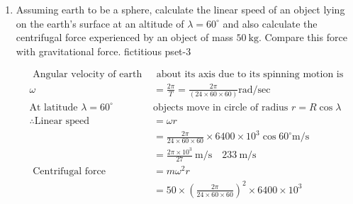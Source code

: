 \begin{enumerate} [label=\color{ocre}\textbf{\arabic*.}]
\begin{figure}[H]
	\centering
	\texttt{[image: pset-3- fict]}
\end{figure}
\begin{answer}
\begin{align*}
\text { Horizontal acceleration of the system is } a_{0}&=\frac{F}{M+m}
\intertext{According to question, the block does not slide on the wedge, therefore if block is seen from the reference frame of the wedge it will appear stationary. The wedge has a linear acceleration $a_{0}$ therefore if observation is made from the wedge frame a pseudo force $-m a_{0}$ must be applied on the block as shown in figure. Block is stationary on the wedge so component of forces parallel to the inclined plane must cancel.}
\text{Therefore,} \ m g \sin \theta&=m a_{0} \cos \theta\\  \text{or}\ \tan \theta&=\frac{a_{0}}{g}\\&=\frac{F}{(M+m) g}\\ \text{or}\ F&=(M+m) g \tan \theta
\end{align*}
\end{answer}
\item Assuming earth to be a sphere, calculate the linear speed of an object lying on the earth's surface at an altitude of $\lambda=60^{\circ}$ and also calculate the centrifugal force experienced by an object of mass $50 \mathrm{~kg}$. Compare this force with gravitational force.
fictitious pset-3
\begin{answer}
	\begin{align*}
	\text { Angular velocity of earth }&\text{ about its axis due to its spinning motion is}\\
	\omega&=\frac{2 \pi}{T}=\frac{2 \pi}{(24 \times 60 \times 60)} \mathrm{rad} / \mathrm{sec}\\
	\text{At latitude $\lambda=60^{\circ}$ }&\text{objects move in circle of radius $r=R \cos \lambda$}\\
	\therefore \text {Linear speed }&=\omega r\\
	&=\frac{2 \pi}{24 \times 60 \times 60} \times 6400 \times 10^{3} \cos 60^{\circ} \mathrm{m} / \mathrm{s} \\
	&=\frac{2 \pi \times 10^{3}}{27} \mathrm{~m} / \mathrm{s} \quad 233 \mathrm{~m} / \mathrm{s}\\
	\text { Centrifugal force }&=m \omega^{2} r \\
	&=50 \times\left(\frac{2 \pi}{24 \times 60 \times 60}\right)^{2} \times 6400 \times 10^{3} \\

\end{align*}
\end{answer}
\end{enumerate}
